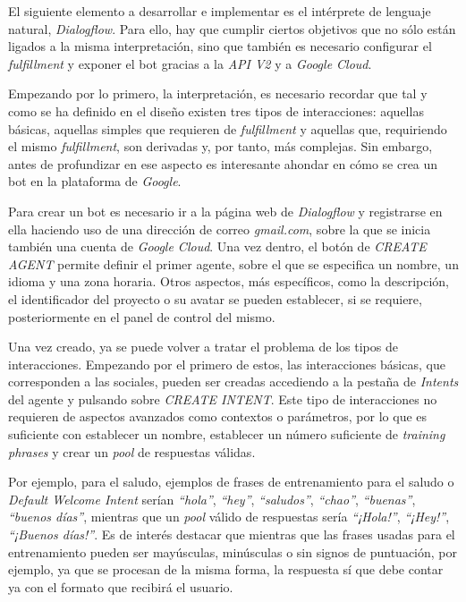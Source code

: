 \documentclass[11pt,spanish,listoffigures]{tfgetsinf}
\begin{document}
El siguiente elemento a desarrollar e implementar es el intérprete de lenguaje natural, \textit{Dialogflow}. Para ello, hay que cumplir ciertos objetivos que no sólo están ligados a la misma interpretación, sino que también es necesario configurar el \textit{fulfillment} y exponer el bot gracias a la \textit{API V2} y a \textit{Google Cloud}.

Empezando por lo primero, la interpretación, es necesario recordar que tal y como se ha definido en el diseño existen tres tipos de interacciones: aquellas básicas, aquellas simples que requieren de \textit{fulfillment} y aquellas que, requiriendo el mismo \textit{fulfillment}, son derivadas y, por tanto, más complejas. Sin embargo, antes de profundizar en ese aspecto es interesante ahondar en cómo se crea un bot en la plataforma de \textit{Google}.

Para crear un bot es necesario ir a la página web de \textit{Dialogflow} y registrarse en ella haciendo uso de una dirección de correo \textit{gmail.com}, sobre la que se inicia también una cuenta de \textit{Google Cloud}. Una vez dentro, el botón de \textit{CREATE AGENT} permite definir el primer agente, sobre el que se especifica un nombre, un idioma y una zona horaria. Otros aspectos, más específicos, como la descripción, el identificador del proyecto o su avatar se pueden establecer, si se requiere, posteriormente en el panel de control del mismo.

Una vez creado, ya se puede volver a tratar el problema de los tipos de interacciones. Empezando por el primero de estos, las interacciones básicas, que corresponden a las sociales, pueden ser creadas accediendo a la pestaña de \textit{Intents} del agente y pulsando sobre \textit{CREATE INTENT}. Este tipo de interacciones no requieren de aspectos avanzados como contextos o parámetros, por lo que es suficiente con establecer un nombre, establecer un número suficiente de \textit{training phrases} y crear un \textit{pool} de respuestas válidas. 

Por ejemplo, para el saludo, ejemplos de frases de entrenamiento para el saludo o \textit{Default Welcome Intent} serían \textit{“hola”}, \textit{“hey”}, \textit{“saludos”}, \textit{“chao”}, \textit{“buenas”}, \textit{“buenos días”}, mientras que un \textit{pool} válido de respuestas sería \textit{“¡Hola!”}, \textit{“¡Hey!”}, \textit{“¡Buenos días!”}. Es de interés destacar que mientras que las frases usadas para el entrenamiento pueden ser mayúsculas, minúsculas o sin signos de puntuación, por ejemplo, ya que se procesan de la misma forma, la respuesta sí que debe contar ya con el formato que recibirá el usuario.
\end{document}
